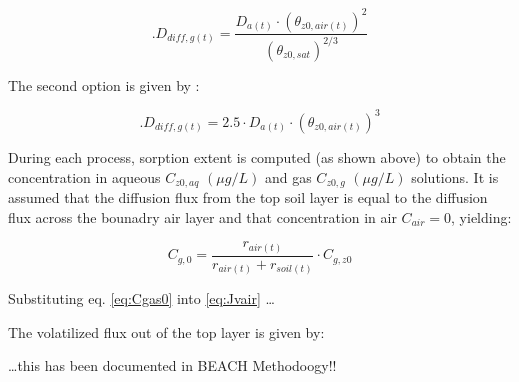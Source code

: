 \documentclass[]{article}
\begin{document}
\[.
D_{diff,g(t)} = \frac{D_{a(t)}\cdot (\theta_{z0,air(t)})^2}{(\theta_{z0,sat})^{2/3}}
\]

The second option is given by \citep{Currie1960, Bakker1987}:

\[.
D_{diff,g(t)} = 2.5 \cdot D_{a(t)}\cdot (\theta_{z0,air(t)})^3
\]

During each process, sorption extent is computed (as shown above) to
obtain the concentration in aqueous \(C_{z0,aq}\) \((\mu g/L)\) and gas
\(C_{z0,g}\) \((\mu g/L)\) solutions. It is assumed that the diffusion
flux from the top soil layer is equal to the diffusion flux across the
bounadry air layer and that concentration in air \(C_{air}=0\),
yielding:

\begin{equation}
C_{g,0} = \frac{r_{air(t)}}{r_{air(t)} + r_{soil(t)}} \cdot C_{g,z0}
\label{eq:Cgas0} 
\end{equation}

Substituting eq. \ref{eq:Cgas0} into \ref{eq:Jvair} \ldots{}

The volatilized flux out of the top layer is given by:

\ldots{}this has been documented in BEACH Methodoogy!!


\end{document}
